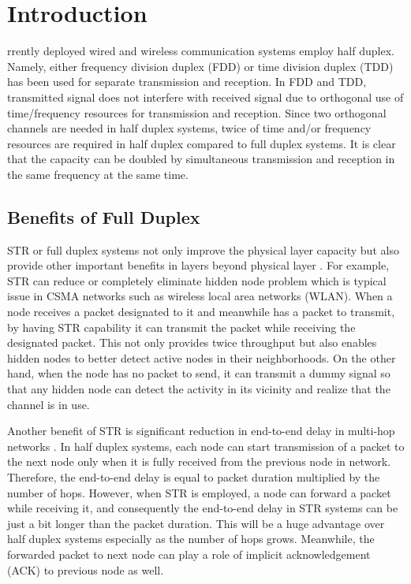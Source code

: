 \documentclass[twocolumn]{IEEEtran}
\begin{document}
\section{Introduction}
rrently deployed wired and wireless communication
systems employ half duplex. Namely, either frequency division duplex
(FDD) or time division duplex (TDD) has been used for separate
transmission and reception. In FDD and TDD, transmitted signal does
not interfere with received signal due to orthogonal use of
time/frequency resources for transmission and reception. Since two
orthogonal channels are needed in half duplex systems, twice of time
and/or frequency resources are required in half duplex compared to
full duplex systems. It is clear that the capacity can be doubled by
simultaneous transmission and reception in the same frequency at the
same time.

\subsection{Benefits of Full Duplex}

STR or full duplex systems not only improve the physical layer
capacity but also provide other important benefits in layers beyond
physical layer \cite{stanford}. For example, STR can reduce or
completely eliminate hidden node problem which is typical issue in
CSMA networks such as wireless local area networks (WLAN). When a
node receives a packet designated to it and meanwhile has a packet
to transmit, by having STR capability it can transmit the packet
while receiving the designated packet. This not only provides twice
throughput but also enables hidden nodes to better detect active
nodes in their neighborhoods. On the other hand, when the node has
no packet to send, it can transmit a dummy signal so that any hidden
node can detect the activity in its vicinity and realize that the
channel is in use.

Another benefit of STR is significant reduction in end-to-end delay
in multi-hop networks \cite{stanford}. In half duplex systems, each
node can start transmission of a packet to the next node only when
it is fully received from the previous node in network. Therefore,
the end-to-end delay is equal to packet duration multiplied by the
number of hops. However, when STR is employed, a node can forward a
packet while receiving it, and consequently the end-to-end delay in
STR systems can be just a bit longer than the packet duration. This
will be a huge advantage over half duplex systems especially as the
number of hops grows. Meanwhile, the forwarded packet to next node
can play a role of implicit acknowledgement (ACK) to previous node
as well.
\end{document}
